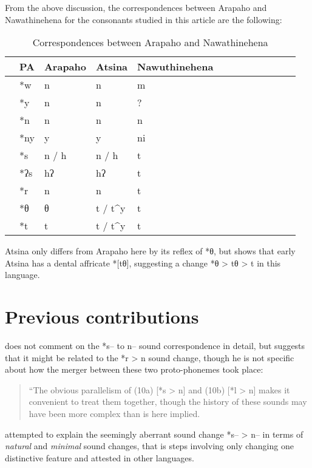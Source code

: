 \documentclass[oldfontcommands,oneside,a4paper,11pt]{article}
\begin{document}
From the above discussion, the correspondences between Arapaho and Nawathinehena for the consonants studied in this article are the following:

\begin{table}[H]
\caption{Correspondences between Arapaho and Nawathinehena} \centering
\begin{tabular}{lllllllllllll}
\toprule
&PA & Arapaho & Atsina & Nawuthinehena \\
\midrule
&*w &n&n&m\\
&*y  &n&n& ?\\
&*n &n&n&   n\\
&*ny &y&y&   ni\\
&*s  &n / h&n / h& t\\
 
& *ʔs& hʔ &hʔ & t \\
&*r    &n&n& t  \\
&*θ & θ&t / t^y&  t \\
&*t & t&t / t^y&  t \\
\bottomrule
\end{tabular}
\end{table}
Atsina only differs from Arapaho here by its reflex of *θ, but \citet[114]{goddard74arapaho} shows that early Atsina has a dental affricate *[tθ], suggesting a change *θ > tθ > t in this language.



\section{Previous contributions}
\citet[107]{goddard74arapaho} does not comment on the  *s--   to n-- sound correspondence in detail, but suggests that it might be related to the *r > n sound change, though he is not specific about how the merger between these two proto-phonemes took place:

\begin{quote}
``The obvious parallelism of (10a) [*s > n] and (10b) [*l > n] makes it convenient to treat them together, though the history of these sounds may have been more complex than is here implied. 

\end{quote} 

 \citet{picard94sn} attempted to explain the seemingly aberrant sound change *s-- > n-- in terms of \textit{natural}  and \textit{minimal} sound changes, that is steps involving only changing one distinctive feature and attested in other languages.
 
\end{document}
